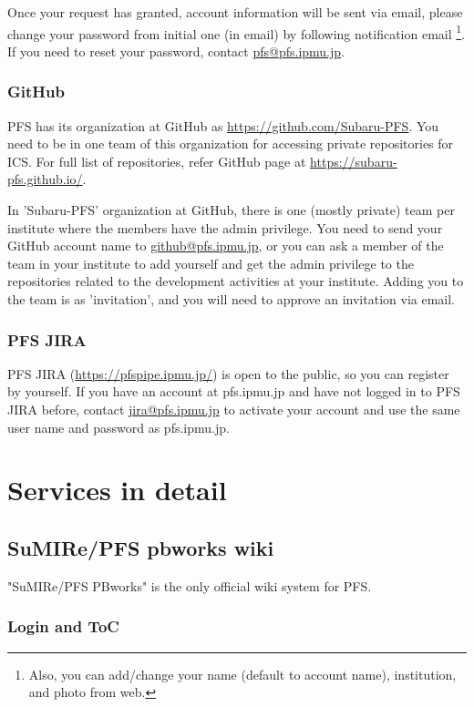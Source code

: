 \documentclass[a4paper,notitlepage]{article}
\begin{document}
Once your request has granted, 
account information will be sent via email, please change your password 
from initial one (in email) by following notification email 
\footnote{Also, you can add/change your name (default to account name), 
institution, and photo from web.}. 
If you need to reset your password, contact \url{pfs@pfs.ipmu.jp}. 


\subsubsection{GitHub}

PFS has its organization at GitHub as \url{https://github.com/Subaru-PFS}. 
You need to be in one team of this organization for accessing private 
repositories for ICS. 
For full list of repositories, refer GitHub page at 
\url{https://subaru-pfs.github.io/}.

In 'Subaru-PFS' organization at GitHub, 
there is one (mostly private) team per institute where the members have 
the admin privilege. 
You need to send your GitHub account name to \url{github@pfs.ipmu.jp}, or 
you can ask a member of the team in your institute to add yourself and 
get the admin privilege to the repositories related to the development 
activities at your institute. Adding you to the team is as 'invitation', 
and you will need to approve an invitation via email. 


\subsubsection{PFS JIRA}

PFS JIRA (\url{https://pfspipe.ipmu.jp/}) is open to the public, 
so you can register by yourself. 
If you have an account at pfs.ipmu.jp and have not logged in to PFS JIRA 
before, contact \url{jira@pfs.ipmu.jp} to activate your account and use 
the same user name and password as pfs.ipmu.jp. 

\section{Services in detail}

\subsection{SuMIRe/PFS pbworks wiki}

"SuMIRe/PFS PBworks" is the only official wiki system for PFS. 

\subsubsection{Login and ToC}
\end{document}
